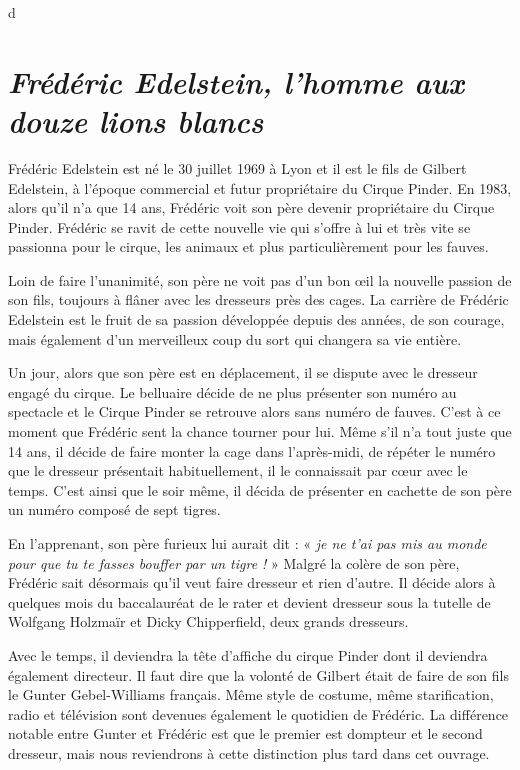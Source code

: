 d\section*{\textit{Frédéric Edelstein, l’homme aux douze lions blancs}}
{}

Frédéric Edelstein est né le 30 juillet 1969 à Lyon et il est le fils de Gilbert Edelstein, à l’époque commercial et futur propriétaire du Cirque Pinder. En 1983, alors qu'il n'a que 14 ans, Frédéric voit son père devenir propriétaire du Cirque Pinder. Frédéric se ravit de cette nouvelle vie qui s’offre à lui et très vite se passionna pour le cirque, les animaux et plus particulièrement pour les fauves.

Loin de faire l’unanimité, son père ne voit pas d’un bon œil la nouvelle passion de son fils, toujours à flâner avec les dresseurs près des cages. La carrière de Frédéric Edelstein est le fruit de sa passion développée depuis des années, de son courage, mais également d'un merveilleux coup du sort qui changera sa vie entière.

Un jour, alors que son père est en déplacement, il se dispute avec le dresseur engagé du cirque. Le belluaire décide de ne plus présenter son numéro au spectacle et le Cirque Pinder se retrouve alors sans numéro de fauves. C’est à ce moment que Frédéric sent la chance tourner pour lui. Même s'il n’a tout juste que 14 ans, il décide de faire monter la cage dans l’après-midi, de répéter le numéro que le dresseur présentait habituellement, il le connaissait par cœur avec le temps. C’est ainsi que le soir même, il décida de présenter en cachette de son père un numéro composé de sept tigres.

En l’apprenant, son père furieux lui aurait dit : « \textit{je ne t’ai pas mis au monde pour que tu te fasses bouffer par un tigre !} » Malgré la colère de son père, Frédéric sait désormais qu’il veut faire dresseur et rien d’autre. Il décide alors à quelques mois du baccalauréat de le rater et devient dresseur sous la tutelle de Wolfgang Holzmaïr et Dicky Chipperfield, deux grands dresseurs.

Avec le temps, il deviendra la tête d’affiche du cirque Pinder dont il deviendra également directeur. Il faut dire que la volonté de Gilbert était de faire de son fils le Gunter Gebel-Williams français. Même style de costume, même starification, radio et télévision sont devenues également le quotidien de Frédéric. La différence notable entre Gunter et Frédéric est que le premier est dompteur et le second dresseur, mais nous reviendrons à cette distinction plus tard dans cet ouvrage.

